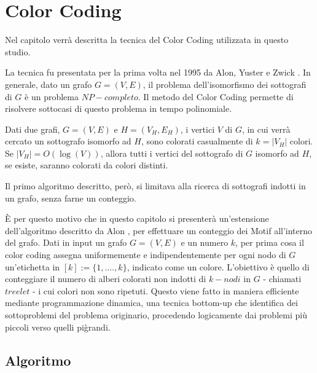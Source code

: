 \chapter{Color Coding}

Nel capitolo verr\`a descritta la tecnica del Color Coding utilizzata in questo studio.

La tecnica fu presentata per la prima volta nel 1995 da Alon, Yuster e Zwick \cite{alon1995color}.
In generale, dato un grafo $G = (V,E)$, il problema dell'isomorfismo dei sottografi  di $G$ \`e un problema $NP-completo$.
Il metodo del Color Coding permette di risolvere sottocasi di questo problema in tempo polinomiale.

Dati due grafi, $ G = (V,E) $ e $H = (V_H, E_H)$, i vertici $V$ di $G$, in cui verr\`a cercato un  sottografo isomorfo ad $H$, sono colorati casualmente di $k = |V_H|$ colori. Se $|V_H| = O(\log(V))$, allora tutti i vertici del sottografo di $G$ isomorfo ad $H$, se esiste, saranno colorati da colori distinti.   

Il primo algoritmo descritto, per\`o, si limitava alla ricerca di sottografi indotti in un grafo, senza farne un conteggio.
 
\`E per questo motivo che in questo capitolo si presenter\`a un'estensione dell'algoritmo descritto da Alon \cite{alon1995color}, per effettuare un conteggio dei Motif all'interno del grafo.
Dati in input un grafo $ G=(V,E) $ e un numero $ k $, per prima cosa il color coding assegna uniformemente e indipendentemente per ogni nodo di $ G $ un'etichetta in $ [k] := \{1,....,k\} $, indicato come un colore.
L'obiettivo \`e quello di conteggiare il numero di alberi colorati non indotti di $ k-nodi $ in $ G $ - chiamati $ treelet $ - i cui colori non sono ripetuti.
Questo viene fatto in maniera efficiente mediante  programmazione dinamica, una tecnica bottom-up che identifica dei sottoproblemi del problema originario, procedendo logicamente dai problemi pi\`u piccoli verso quelli pi\` grandi.




\section{Algoritmo}
\label{section1}

